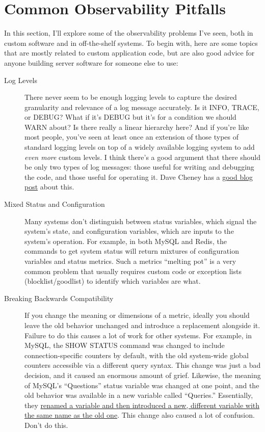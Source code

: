\documentclass{vivid_layout}
\begin{document}
\section{Common Observability Pitfalls}

In this section, I'll explore some of the observability problems I've seen, both in custom
software and in off-the-shelf systems. To begin with, here are some
topics that are mostly related to custom application code, but are also good
advice for anyone building server software for someone else to use:

\begin{description}

\item[Log Levels] There never seem to be enough logging levels to 
capture the desired granularity and relevance of a log message accurately. Is it INFO,
TRACE, or DEBUG? What if it's DEBUG but it's for a condition we should WARN
about? Is there really a linear hierarchy here? And if you're like most people,
you've seen at least once an extension of those types of standard logging levels
on top of a widely available logging system to add \emph{even more} custom
levels. I think there's a good argument that there should be only two
types of log messages: those useful for writing and debugging the code, and
those useful for operating it. Dave Cheney has a
\href{http://dave.cheney.net/2015/11/05/lets-talk-about-logging}{good blog post}
about this.

\item[Mixed Status and Configuration] Many systems don't distinguish between
status variables, which signal the system's state, and configuration variables,
which are inputs to the system's operation. For example, in both MySQL and
Redis, the commands to get system status will return mixtures of configuration
variables and status metrics. Such a metrics ``melting pot'' is a very common problem that usually
requires custom code or exception lists (blocklist/goodlist) to identify which
variables are what.

\item[Breaking Backwards Compatibility] If you change the meaning or dimensions
of a metric, ideally you should leave the old behavior unchanged and introduce a
replacement alongside it. Failure to do this causes a lot of work for other
systems. For example, in MySQL, the SHOW STATUS command was changed to include
connection-specific counters by default, with the old system-wide global
counters accessible via a different query syntax. This change was just a bad decision,
and it caused an enormous amount of grief. Likewise, the meaning of MySQL's
``Questions'' status variable was changed at one point, and the old behavior was
available in a new variable called ``Queries.'' Essentially, they
\href{http://dev.mysql.com/doc/refman/5.0/en/server-status-variables.html#statvar\_Questions}{renamed
a variable and then introduced a new, different variable with the same name as
the old one}. This change also caused a lot of confusion. Don't do this.


\end{description}
\end{document}
